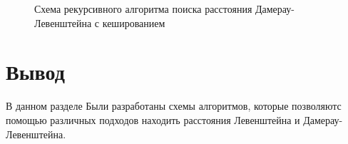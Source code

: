 \begin{figure}[h!]
	
		
		\caption{Схема рекурсивного алгоритма поиска расстояния Дамерау-Левенштейна с кешированием}
		
		\label{fig:dleven_rec_cash3}
		
	\end{figure}

\section*{Вывод}

В данном разделе Были разработаны схемы алгоритмов, которые позволяютс помощью различных подходов находить расстояния Левенштейна и Дамерау-Левенштейна.

